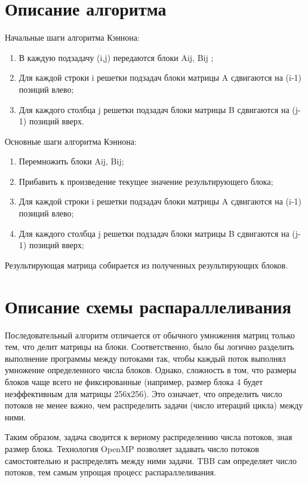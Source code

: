 \documentclass{report}
\begin{document}
\section*{Описание алгоритма}
\par Начальные шаги алгоритма Кэннона:
\begin{enumerate}
\item В каждую подзадачу (i,j) передаются блоки Aij, Bij ;
\item Для каждой строки i решетки подзадач блоки матрицы A сдвигаются на (i-1) позиций влево;
\item Для каждого столбца j решетки подзадач блоки матрицы B сдвигаются на (j-1) позиций вверх.
\end{enumerate}
\par Основные шаги алгоритма Кэннона:
\begin{enumerate}
\item Перемножить блоки Aij, Bij;
\item Прибавить к произведение текущее значение результирующего блока;
\item Для каждой строки i решетки подзадач блоки матрицы A сдвигаются на (i-1) позиций влево;
\item Для каждого столбца j решетки подзадач блоки матрицы B сдвигаются на (j-1) позиций вверх;
\end{enumerate}
Результирующая матрица собирается из полученных результирующих блоков.
\newpage

\section*{Описание схемы распараллеливания}
\par Последовательный алгоритм отличается от обычного умножения матриц только тем, что делит матрицы на блоки. Соответственно, было бы логично разделить выполнение программы между потоками так, чтобы каждый поток выполнял умножение определенного числа блоков.
Однако, сложность в том, что размеры блоков чаще всего не фиксированные (например, размер блока 4 будет неэффективным для матрицы 256х256). Это означает, что определить число потоков не менее важно, чем распределить задачи (число итераций цикла) между ними.
\par Таким образом, задача сводится к верному распределению числа потоков, зная размер блока. Технология OpenMP позволяет задавать число потоков самостоятельно и распределять между ними задачи. TBB сам определяет число потоков, тем самым упрощая процесс распараллеливания. 
\end{document}
